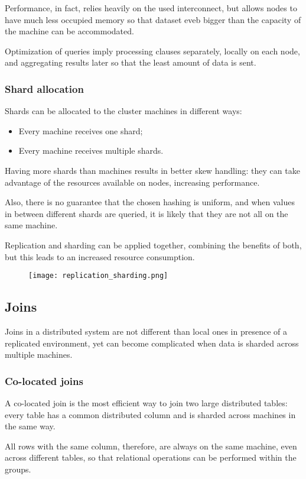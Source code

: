 Performance, in fact, relies heavily on the used interconnect, but allows nodes to have much less occupied memory so that dataset eveb bigger than the capacity of the machine can be accommodated.

Optimization of queries imply processing clauses separately, locally on each node, and aggregating results later so that the least amount of data is sent.

\subsubsection{Shard allocation}
Shards can be allocated to the cluster machines in different ways:
\begin{itemize}
	\item Every machine receives one shard;
	\item Every machine receives multiple shards.
\end{itemize}
Having more shards than machines results in better skew handling: they can take advantage of the resources available on nodes, increasing performance.

Also, there is no guarantee that the chosen hashing is uniform, and when values in between different shards are queried, it is likely that they are not all on the same machine.

Replication and sharding can be applied together, combining the benefits of both, but this leads to an increased resource consumption.
\begin{figure}[h]
	\texttt{[image: replication\_sharding.png]}
	\centering
\end{figure}

\subsection{Joins}
Joins in a distributed system are not different than local ones in presence of a replicated environment, yet can become complicated when data is sharded across multiple machines. 

\subsubsection{Co-located joins}
A co-located join is the most efficient way to join two large distributed tables: every table has a common distributed column and is sharded across machines in the same way.

All rows with the same column, therefore, are always on the same machine, even across different tables, so that relational operations can be performed within the groups.

